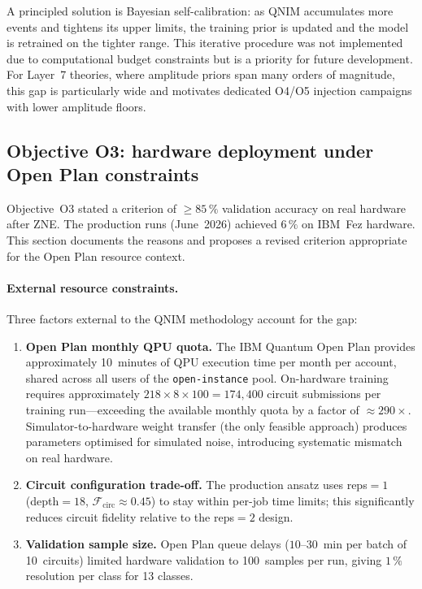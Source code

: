 \documentclass[11pt,a4paper, english]{book}
\theoremstyle{plain}
\theoremstyle{definition}
\numberwithin{equation}{chapter}
\numberwithin{figure}{chapter}
\numberwithin{table}{chapter}
\begin{document}
A principled solution is Bayesian self-calibration: as QNIM accumulates
more events and tightens its upper limits, the training prior is updated
and the model is retrained on the tighter range.  This iterative procedure
was not implemented due to computational budget constraints but is a
priority for future development.  For Layer~7 theories, where amplitude
priors span many orders of magnitude, this gap is particularly wide and
motivates dedicated O4/O5 injection campaigns with lower amplitude floors.

\subsection{Objective O3: hardware deployment under Open Plan constraints}
\label{subsec:disc-o3-gap}
 
Objective~O3 stated a criterion of $\geq85\,\%$ validation accuracy
on real hardware after ZNE. The production runs (June~2026) achieved
$6\,\%$ on IBM~Fez hardware. This section documents the reasons and proposes a revised criterion appropriate for the
Open Plan resource context.
 
\paragraph{External resource constraints.}
Three factors external to the QNIM methodology account for the gap:
 
\begin{enumerate}
  \item \textbf{Open Plan monthly QPU quota.}
        The IBM Quantum Open Plan provides approximately 10~minutes
        of QPU execution time per month per account, shared across
        all users of the \texttt{open-instance} pool.
        On-hardware training requires approximately
        $218\times8\times100{=}174{,}400$ circuit submissions per
        training run---exceeding the available monthly quota by
        a factor of ${\approx}290\times$.
        Simulator-to-hardware weight transfer (the only feasible
        approach) produces parameters optimised for simulated noise,
        introducing systematic mismatch on real hardware.
 
  \item \textbf{Circuit configuration trade-off.}
        The production ansatz uses reps$=1$ (depth$=18$,
        $\mathcal{F}_\mathrm{circ}\approx0.45$) to stay within
        per-job time limits; this significantly reduces circuit
        fidelity relative to the reps$=2$ design.
 
  \item \textbf{Validation sample size.}
        Open Plan queue delays ($10$--$30$~min per batch of
        10~circuits) limited hardware validation to 100~samples
        per run, giving $1\,\%$ resolution per class for 13 classes.
\end{enumerate}
 
\end{document}
